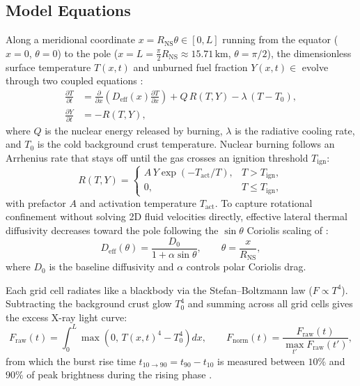 \documentclass[11pt,a4paper]{article}
\begin{document}
\subsection{Model Equations}
Along a meridional coordinate $x = R_{\mathrm{NS}}\theta \in [0, L]$ running from the equator ($x = 0$, $\theta = 0$) to the pole ($x = L = \frac{\pi}{2}R_{\mathrm{NS}} \approx 15.71\,\mathrm{km}$, $\theta = \pi/2$), the dimensionless surface temperature $T(x,t)$ and unburned fuel fraction $Y(x,t) \in$ evolve through two coupled equations \citep{Zingale_HydroExamples,Eiden2020}:
\begin{align}
    \frac{\partial T}{\partial t} &= \frac{\partial}{\partial x}\!\left(D_{\mathrm{eff}}(x)\frac{\partial T}{\partial x}\right) + Q\,R(T, Y) - \lambda\,(T - T_0), \label{eq:temp_pde} \\
    \frac{\partial Y}{\partial t} &= -R(T, Y), \label{eq:fuel_pde}
\end{align}
where $Q$ is the nuclear energy released by burning, $\lambda$ is the radiative cooling rate, and $T_0$ is the cold background crust temperature. Nuclear burning follows an Arrhenius rate that stays off until the gas crosses an ignition threshold $T_{\mathrm{ign}}$:
\begin{equation}
    R(T, Y) = \begin{cases}
        A\,Y\exp(-T_{\mathrm{act}} / T), & T > T_{\mathrm{ign}}, \\
        0, & T \le T_{\mathrm{ign}},
    \end{cases}
\end{equation}
with prefactor $A$ and activation temperature $T_{\mathrm{act}}$. To capture rotational confinement without solving 2D fluid velocities directly, effective lateral thermal diffusivity decreases toward the pole following the $\sin\theta$ Coriolis scaling of \citet{Spitkovsky2002}:
\begin{equation}
    D_{\mathrm{eff}}(\theta) = \frac{D_0}{1 + \alpha \sin\theta}, \qquad \theta = \frac{x}{R_{\mathrm{NS}}},
\end{equation}
where $D_0$ is the baseline diffusivity and $\alpha$ controls polar Coriolis drag.

Each grid cell radiates like a blackbody via the Stefan--Boltzmann law ($F \propto T^4$). Subtracting the background crust glow $T_0^4$ and summing across all grid cells gives the excess X-ray light curve:
\begin{equation}
    F_{\mathrm{raw}}(t) = \int_0^L \max\!\left(0,\, T(x,t)^4 - T_0^4\right) dx, \qquad F_{\mathrm{norm}}(t) = \frac{F_{\mathrm{raw}}(t)}{\max_{t'} F_{\mathrm{raw}}(t')},
\end{equation}
from which the burst rise time $t_{10 \to 90} = t_{90} - t_{10}$ is measured between $10\%$ and $90\%$ of peak brightness during the rising phase \citep{Bult2022}.
\end{document}
